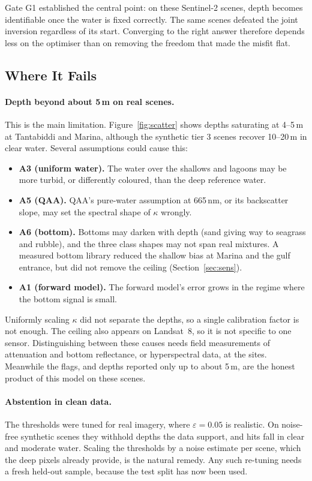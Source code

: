 \documentclass[remotesensing,article,submit,pdftex]{Definitions/mdpi}
\begin{document}
Gate G1 established the central point: on these Sentinel-2 scenes, depth becomes identifiable once the water is fixed correctly. The same scenes defeated the joint inversion regardless of its start. Converging to the right answer therefore depends less on the optimiser than on removing the freedom that made the misfit flat.

\subsection{Where It Fails}

\paragraph{Depth beyond about 5\,m on real scenes.} This is the main limitation. Figure~\ref{fig:scatter} shows depths saturating at 4--5\,m at Tantabiddi and Marina, although the synthetic tier 3 scenes recover 10--20\,m in clear water. Several assumptions could cause this:
\begin{itemize}
\item \textbf{A3 (uniform water).} The water over the shallows and lagoons may be more turbid, or differently coloured, than the deep reference water.
\item \textbf{A5 (QAA).} QAA's pure-water assumption at 665\,nm, or its backscatter slope, may set the spectral shape of $\kappa$ wrongly.
\item \textbf{A6 (bottom).} Bottoms may darken with depth (sand giving way to seagrass and rubble), and the three class shapes may not span real mixtures. A measured bottom library reduced the shallow bias at Marina and the gulf entrance, but did not remove the ceiling (Section~\ref{sec:sens}).
\item \textbf{A1 (forward model).} The forward model's error grows in the regime where the bottom signal is small.
\end{itemize}
Uniformly scaling $\kappa$ did not separate the depths, so a single calibration factor is not enough. The ceiling also appears on Landsat~8, so it is not specific to one sensor. Distinguishing between these causes needs field measurements of attenuation and bottom reflectance, or hyperspectral data, at the sites. Meanwhile the flags, and depths reported only up to about 5\,m, are the honest product of this model on these scenes.

\paragraph{Abstention in clean data.} The thresholds were tuned for real imagery, where $\varepsilon = 0.05$ is realistic. On noise-free synthetic scenes they withhold depths the data support, and hits fall in clear and moderate water. Scaling the thresholds by a noise estimate per scene, which the deep pixels already provide, is the natural remedy. Any such re-tuning needs a fresh held-out sample, because the test split has now been used.
\end{document}
